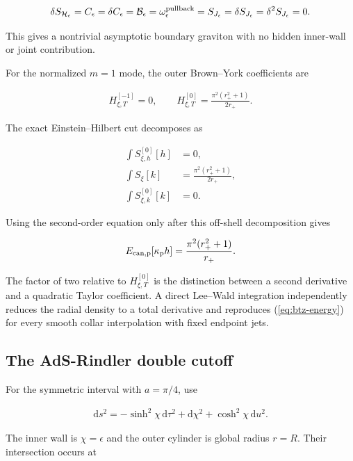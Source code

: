 \begin{align}
\delta S_{\mathcal H_\epsilon}
=C_\epsilon=\delta C_\epsilon
=\mathcal B_\epsilon
=\omega_\epsilon^{\rm pullback}
=S_{J_\epsilon}=\delta S_{J_\epsilon}
=\delta^2S_{J_\epsilon}=0. \label{eq:btz-collar-zero}
\end{align}

This gives a nontrivial asymptotic boundary graviton with no hidden inner-wall or joint contribution.

For the normalized $m=1$ mode, the outer Brown--York coefficients are

\begin{align}
H_{\xi,T}^{[-1]}=0,
\qquad
H_{\xi,T}^{[0]}
=\frac{\pi^2(r_+^2+1)}{2r_+}.
\end{align}

The exact Einstein--Hilbert cut decomposes as

\begin{align}
\int S_{\xi,h}^{[0]}[h]&=0,\\
\int S_\xi[k]&=\frac{\pi^2(r_+^2+1)}{2r_+},\\
\int S_{\xi,k}^{[0]}[k]&=0.
\end{align}

Using the second-order equation only after this off-shell decomposition gives

\begin{align}
E_{{\rm can,p}}[\kappa_{\rm p}h]
=\frac{\pi^2(r_+^2+1)}{r_+}. \label{eq:btz-energy}
\end{align}

The factor of two relative to $H_{\xi,T}^{[0]}$ is the distinction between a second derivative and a quadratic Taylor coefficient. A direct Lee--Wald integration independently reduces the radial density to a total derivative and reproduces (\ref{eq:btz-energy}) for every smooth collar interpolation with fixed endpoint jets.

\subsection{The AdS-Rindler double cutoff}\label{subsec:rindler-cutoff}

For the symmetric interval with $a=\pi/4$, use

\begin{align}
\mathrm ds^2
=-\sinh^2\chi\,\mathrm d\tau^2
+\mathrm d\chi^2
+\cosh^2\chi\,\mathrm du^2. \label{eq:rindler-metric}
\end{align}

The inner wall is $\chi=\epsilon$ and the outer cylinder is global radius $r=R$. Their intersection occurs at


